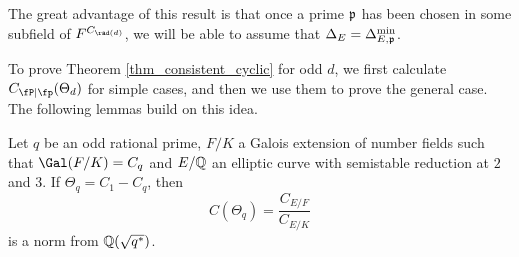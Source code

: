 The great advantage of this result is that once a prime $\mathfrak{p}$ has been chosen in some subfield of $F^{C_{\rad(d)}}$, we will be able to assume that $\Delta_E=\Delta_{E,\mathfrak{p}}^{\min}$. 

To prove Theorem \ref{thm_consistent_cyclic} for odd $d$, we first calculate $\Cp(\Theta_d)$ for simple cases, and then we use them to prove the general case. The following lemmas build on this idea.

\begin{lemma}\label{lem_Cp}
    Let $q$ be an odd rational prime, $F/K$ a Galois extension of number fields such that $\Gal(F/K)=C_q$ and $E/\mathbb{Q}$ an elliptic curve with semistable reduction at $2$ and $3$. If $\Theta_q=C_1-C_q$, then 
    $$C(\Theta_q)=\frac{C_{E/F}}{C_{E/K}}$$
    is a norm from $\mathbb{Q}(\sqrt{q^*})$.
\end{lemma}

